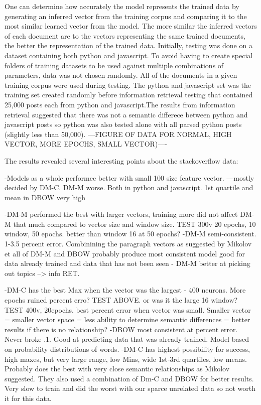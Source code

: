 One can determine how accurately the model represents the trained data by generating an inferred vector from the training corpus and comparing it to the most similar learned vector from the model. The more similar the inferred vectors of each document are to the vectors representing the same trained documents, the better the representation of the trained data. Initially, testing was done on a dataset containing both python and javascript. To avoid having to create special folders of training datasets to be used against multiple combinations of parameters, data was not chosen randomly. All of the documents in a given training corpus were used during testing. The python and javascript set was the training set created randomly before information retrieval testing that contained 25,000 posts each from python and javascript.The results from information retrieval suggested that there was not a semantic differece between python and javascript posts so python was also tested alone with all parsed python posts (slightly less than 50,000). ---FIGURE OF DATA FOR NORMAL, HIGH VECTOR, MORE EPOCHS, SMALL VECTOR)----

The results revealed several interesting points about the stackoverflow data:

-Models as a whole performec better with small 100 size feature vector. ---mostly decided by DM-C. DM-M worse. Both in python and javascript. 1st quartile and mean in DBOW very high

-DM-M performed the best with larger vectors, training more did not affect DM-M that much compared to vector size and window size. TEST 300v 20 epochs, 10 window, 50 epochs. better than window 16 at 50 epochs? 
-DM-M semi-consistent. 1-3.5 percent error. Combinining the paragraph vectors as suggested by Mikolov et all of DM-M and DBOW probably produce most consistent model good for data already trained and data that has not been seen - DM-M better at picking out topics  --> info RET.

-DM-C has the best Max when the vector was the largest - 400 neurons. More epochs ruined percent erro? TEST ABOVE. or was it the large 16 window? TEST 400v, 20epochs. best percent error when vector was small. Smaller vector = smaller vector space = less ability to determine semantic differences = better results if there is no relationship? -DBOW most consistent at percent error. Never broke .1. Good at predicting data that was already trained. Model based on probability distributions of words.
-DM-C has highest possibility for success, high maxes, but very large range, low Mins, wide 1st-3rd quartiles, low means. Probably does the best with very close semantic relationships as Mikolov suggested. They also used a combination of Dm-C and DBOW for better results. Very slow to train and did the worst with our sparce unrelated data so not worth it for this data.



